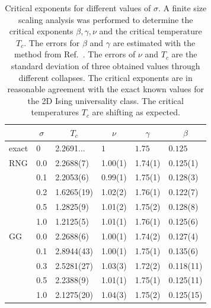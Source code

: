 \documentclass[pre,twocolumn,groupedaddress,showpacs,showkeys,amsmath,amssymb,floatfix]{revtex4-1}
\begin{document}
        \begin{table}[htb]
            \begin{ruledtabular}
                \begin{tabular}{l l l l l l}
                     & \multicolumn{1}{c}{\(\sigma\)} & \multicolumn{1}{c}{\(T_c\)} & \multicolumn{1}{c}{\(\nu\)} & \multicolumn{1}{c}{\(\gamma\)} & \multicolumn{1}{c}{\(\beta\)}\\
                    \hline
                    exact        & 0   & 2.2691... & \(1\)    & \(1.75\) & \(0.125\)\\
                    \hline
                    RNG          & 0.0 & 2.2688(7) & 1.00(1) & 1.74(1) & 0.125(1) \\
                                 & 0.1 & 2.2053(6) & 0.99(1) & 1.75(1) & 0.128(3) \\
                                 & 0.2 & 1.6265(19)& 1.02(2) & 1.76(1) & 0.122(7)\\
                                 & 0.5 & 1.2825(9) & 1.01(2) & 1.75(2) & 0.128(8)\\
                                 & 1.0 & 1.2125(5) & 1.01(1) & 1.76(1) & 0.125(6)\\
                    \hline
                    GG           & 0.0 & 2.2688(6) & 1.00(1) & 1.74(2) & 0.127(4)\\
                                 & 0.1 & 2.8944(43)& 1.00(1) & 1.75(1) & 0.135(6) \\
                                 & 0.3 & 2.5281(27)& 1.03(3) & 1.72(2) & 0.118(11)\\
                                 & 0.5 & 2.2388(9) & 1.01(1) & 1.75(1) & 0.125(11)\\
                                 & 1.0 & 2.1275(20)& 1.04(3) & 1.75(2) & 0.125(15)\\
                \end{tabular}
            \end{ruledtabular}
            \caption[Critical Exponents for Different $\sigma$]{
                Critical exponents for different values of \(\sigma\). A finite size
                scaling analysis was performed to determine the critical
                exponents \(\beta, \gamma, \nu\) and the critical temperature
                \(T_c\). The errors for \(\beta\) and \(\gamma\) are estimated
                with the method from Ref.~\cite{autoscale2009}. The errors of
                \(\nu\) and \(T_c\) are the standard deviation of three obtained
                values through different collapses. The critical exponents
                are in reasonable agreement with the exact known values for the 2D Ising
                universality class. The critical temperatures $T_c$ are shifting
                as expected.
            }
            \label{tab:critExp}
        \end{table}
\end{document}
